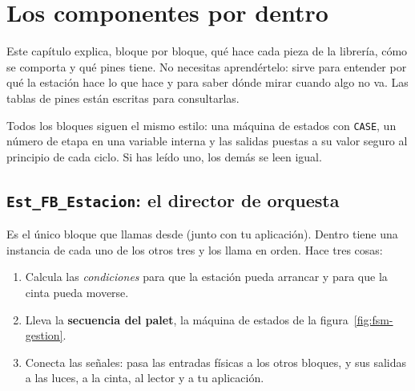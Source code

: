 \chapter{Los componentes por dentro}\label{cap:componentes}

Este capítulo explica, bloque por bloque, qué hace cada pieza de la librería, cómo se comporta y qué pines tiene. No necesitas aprendértelo: sirve para entender por qué la estación hace lo que hace y para saber dónde mirar cuando algo no va. Las tablas de pines están escritas para consultarlas.

\begin{consejo}
Todos los bloques siguen el mismo estilo: una máquina de estados con \texttt{CASE}, un número de etapa en una variable interna y las salidas puestas a su valor seguro al principio de cada ciclo. Si has leído uno, los demás se leen igual.
\end{consejo}

\section{\texttt{Est\_FB\_Estacion}: el director de orquesta}\label{sec:estacion}
Es el único bloque que llamas desde  (junto con tu aplicación). Dentro tiene una instancia de cada uno de los otros tres y los llama en orden. Hace tres cosas:

\begin{enumerate}
\item Calcula las \emph{condiciones} para que la estación pueda arrancar y para que la cinta pueda moverse.
\item Lleva la \textbf{secuencia del palet}, la máquina de estados de la figura~\ref{fig:fsm-gestion}.
\item Conecta las señales: pasa las entradas físicas a los otros bloques, y sus salidas a las luces, a la cinta, al lector y a tu aplicación.
\end{enumerate}

